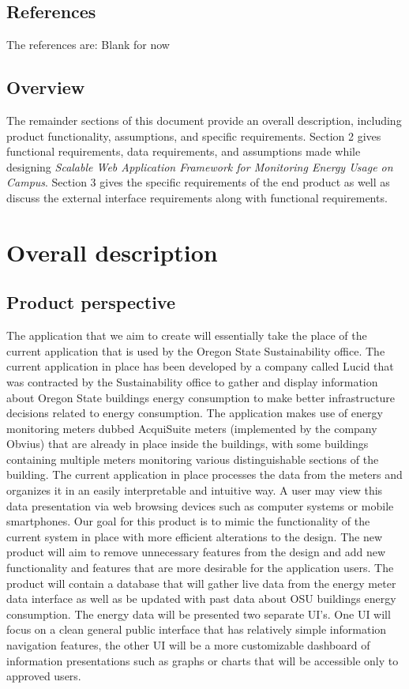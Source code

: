 \documentclass[onecolumn, draftclsnofoot,10pt, compsoc]{IEEEtran}
\begin{document}
    \subsection{References}
	The references are:
	Blank for now

    \subsection{Overview}
	The remainder sections of this document provide an overall description, including product functionality, assumptions, and specific requirements. Section 2 gives functional requirements, data requirements, and assumptions made while designing \textit{Scalable Web Application Framework for Monitoring Energy Usage on Campus}. Section 3 gives the specific requirements of the end product as well as discuss the external interface requirements along with functional requirements.
	
    \section{Overall description}
    \subsection{Product perspective}
    The application that we aim to create will essentially take the place of the current application that is used by the Oregon State Sustainability office. The current application in place has been developed by a company called Lucid that was contracted by the Sustainability office to gather and display information about Oregon State buildings energy consumption to make better infrastructure decisions related to energy consumption. The application makes use of energy monitoring meters dubbed AcquiSuite meters (implemented by the company Obvius) that are already in place inside the buildings, with some buildings containing multiple meters monitoring various distinguishable sections of the building. The current application in place processes the data from the meters and organizes it in an easily interpretable and intuitive way. A user may view this data presentation via web browsing devices such as computer systems or mobile smartphones. Our goal for this product is to mimic the functionality of the current system in place with more efficient alterations to the design. The new product will aim to remove unnecessary features from the design and add new functionality and features that are more desirable for the application users. The product will contain a database that will gather live data from the energy meter data interface as well as be updated with past data about OSU buildings energy consumption. The energy data will be presented two separate UI’s. One UI will focus on a clean general public interface that has relatively simple information navigation features, the other UI will be a more customizable dashboard of information presentations such as graphs or charts that will be accessible only to approved users. 
\end{document}
